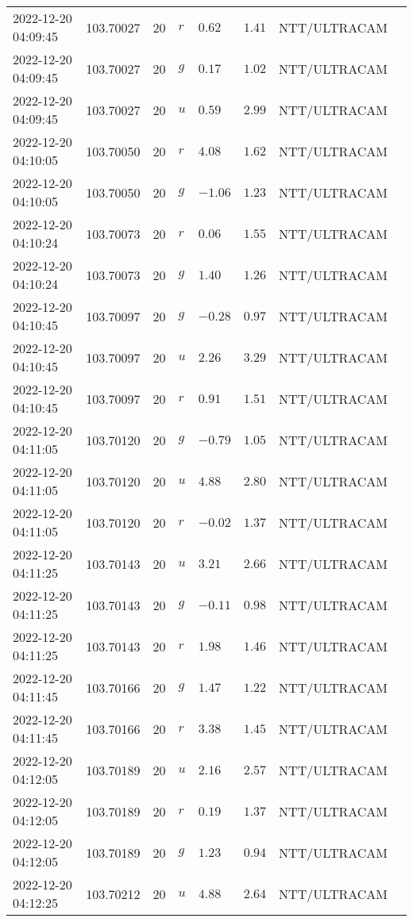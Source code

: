\documentclass{nature_plusfigure}
\begin{document}
\begin{supplement}
\begin{center}
\begin{longtable}{llllllll}
2022-12-20 04:09:45 & 103.70027 & 20 & $r$ & $0.62$ & $1.41$ & NTT/ULTRACAM &  \\ 
2022-12-20 04:09:45 & 103.70027 & 20 & $g$ & $0.17$ & $1.02$ & NTT/ULTRACAM &  \\ 
2022-12-20 04:09:45 & 103.70027 & 20 & $u$ & $0.59$ & $2.99$ & NTT/ULTRACAM &  \\ 
2022-12-20 04:10:05 & 103.70050 & 20 & $r$ & $4.08$ & $1.62$ & NTT/ULTRACAM &  \\ 
2022-12-20 04:10:05 & 103.70050 & 20 & $g$ & $-1.06$ & $1.23$ & NTT/ULTRACAM &  \\ 
2022-12-20 04:10:24 & 103.70073 & 20 & $r$ & $0.06$ & $1.55$ & NTT/ULTRACAM &  \\ 
2022-12-20 04:10:24 & 103.70073 & 20 & $g$ & $1.40$ & $1.26$ & NTT/ULTRACAM &  \\ 
2022-12-20 04:10:45 & 103.70097 & 20 & $g$ & $-0.28$ & $0.97$ & NTT/ULTRACAM &  \\ 
2022-12-20 04:10:45 & 103.70097 & 20 & $u$ & $2.26$ & $3.29$ & NTT/ULTRACAM &  \\ 
2022-12-20 04:10:45 & 103.70097 & 20 & $r$ & $0.91$ & $1.51$ & NTT/ULTRACAM &  \\ 
2022-12-20 04:11:05 & 103.70120 & 20 & $g$ & $-0.79$ & $1.05$ & NTT/ULTRACAM &  \\ 
2022-12-20 04:11:05 & 103.70120 & 20 & $u$ & $4.88$ & $2.80$ & NTT/ULTRACAM &  \\ 
2022-12-20 04:11:05 & 103.70120 & 20 & $r$ & $-0.02$ & $1.37$ & NTT/ULTRACAM &  \\ 
2022-12-20 04:11:25 & 103.70143 & 20 & $u$ & $3.21$ & $2.66$ & NTT/ULTRACAM &  \\ 
2022-12-20 04:11:25 & 103.70143 & 20 & $g$ & $-0.11$ & $0.98$ & NTT/ULTRACAM &  \\ 
2022-12-20 04:11:25 & 103.70143 & 20 & $r$ & $1.98$ & $1.46$ & NTT/ULTRACAM &  \\ 
2022-12-20 04:11:45 & 103.70166 & 20 & $g$ & $1.47$ & $1.22$ & NTT/ULTRACAM &  \\ 
2022-12-20 04:11:45 & 103.70166 & 20 & $r$ & $3.38$ & $1.45$ & NTT/ULTRACAM &  \\ 
2022-12-20 04:12:05 & 103.70189 & 20 & $u$ & $2.16$ & $2.57$ & NTT/ULTRACAM &  \\ 
2022-12-20 04:12:05 & 103.70189 & 20 & $r$ & $0.19$ & $1.37$ & NTT/ULTRACAM &  \\ 
2022-12-20 04:12:05 & 103.70189 & 20 & $g$ & $1.23$ & $0.94$ & NTT/ULTRACAM &  \\ 
2022-12-20 04:12:25 & 103.70212 & 20 & $u$ & $4.88$ & $2.64$ & NTT/ULTRACAM &  \\ 

\end{longtable}
\end{center}
\end{supplement}
\end{document}
